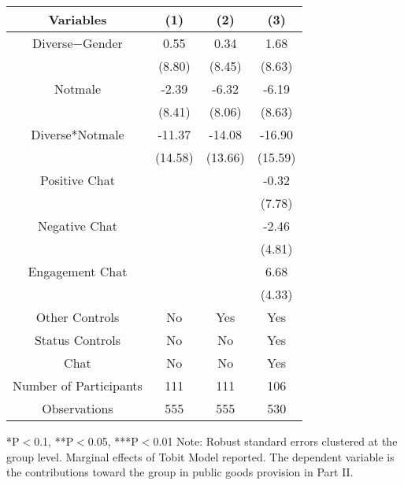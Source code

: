 \begin{table}[htbp]
    \begin{tabular}{c c c c}
    \toprule
    \textbf{Variables} & \textbf{(1)} & \textbf{(2)} & \textbf{(3)}       \\ 
\midrule
Diverse$-$Gender            &     0.55    &    0.34                               &  1.68  \\
                            &     (8.80)  &    (8.45)                             &  (8.63) \\

Notmale                  &      -2.39  &    -6.32                            &  -6.19  \\
                            &      (8.41)  &    (8.06)                        &  (8.63) \\
Diverse*Notmale         &      -11.37   &  -14.08                            &  -16.90 \\
                            &      (14.58)  &    (13.66)                     &  (15.59) \\


Positive Chat                        &                     &                       &  -0.32  \\
                                 &                     &                           &  (7.78)  \\
Negative  Chat                       &                     &                       &  -2.46  \\
                                 &                     &                           &  (4.81)  \\
Engagement Chat                      &                     &                       &  6.68  \\
                                 &                     &                           &  (4.33)  \\
\midrule
Other Controls   &   No &  Yes &    Yes    \\
Status Controls &   No  &    No    &    Yes    \\
Chat          &    No    &    No   &    Yes          \\
\midrule
Number of Participants & 111   &    111 &    106    \\
\midrule
Observations          &   555   &  555  &  530         \\
\bottomrule

\end{tabular}
\begin{footnotesize}
\newline
*P$<$0.1, **P$<$0.05, ***P$<$0.01
\newline
Note: Robust standard errors clustered at the group level. Marginal effects of Tobit Model reported.
\newline
The dependent variable is the contributions toward the group in public goods provision in Part II.\end{footnotesize}
\end{table}
